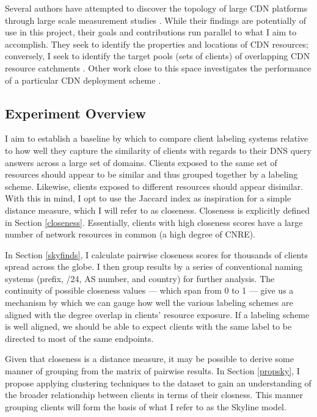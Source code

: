 Several authors have attempted to discover the topology of large CDN platforms through large scale
measurement studies \cite{webcart, Calder2013, benson11}. While their findings are potentially of
use in this project, their goals and contributions run parallel to what I aim to accomplish. They
seek to identify the properties and locations of CDN resources; conversely, I seek to identify the
target pools (sets of clients) of overlapping CDN resource catchments \cite{webcart, Calder2013,
benson11}. Other work close to this space investigates the performance of a particular CDN
deployment scheme \cite{ecs15sigcomm}. 



\subsection{Experiment Overview} \label{oversky}

I aim to establish a baseline by which to compare client labeling systems relative to how well they
capture the similarity of clients with regards to their DNS query answers across a large set of
domains. Clients exposed to the same set of resources should appear to be similar and thus grouped
together by a labeling scheme. Likewise, clients exposed to different resources should appear
disimilar. With this in mind, I opt to use the Jaccard index as inspiration for a simple distance
measure, which I will refer to as closeness. Closeness is explicitly defined in Section
\ref{closeness}.
Essentially, clients with high closeness scores have a large number of network resources in common
(a high degree of CNRE). 

In Section \ref{skyfinds}, I calculate pairwise closeness scores for thousands of clients spread across the
globe. I then group results by a series of conventional naming systems (prefix, /24, AS number, and
country) for further analysis. The continuity of possible closeness values --- which span from 0 to
1 --- give us a mechanism by which we can gauge how well the various labeling schemes are aligned
with the degree overlap in clients' resource exposure. If a labeling scheme is well aligned, we
should be able to expect clients with the same label to be directed to most of the same
endpoints. 

Given that closeness is a distance measure, it may be possible to derive some manner of grouping
from the matrix of pairwise results. In Section \ref{propsky}, I propose applying clustering techniques to
the dataset to gain an understanding of the broader relationship between clients in terms of their
closness. This manner grouping clients will form the basis of what I refer to as the Skyline model.

